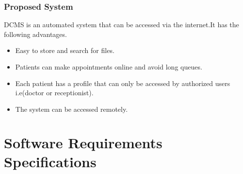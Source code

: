 \documentclass[11 pt]{article}
\begin{document}
\subsubsection{Proposed System}
DCMS is an automated system that can be accessed via the internet.It has the following advantages.
\begin{itemize}
\item
 Easy to store and search for files.
 \item
 Patients can make appointments online and avoid long queues.
 \item
 Each patient has a profile that can only be accessed by authorized users i.e(doctor or receptionist).
 \item
 The system can be accessed remotely.
 


\end{itemize}

\section{Software Requirements Specifications}
\end{document}
